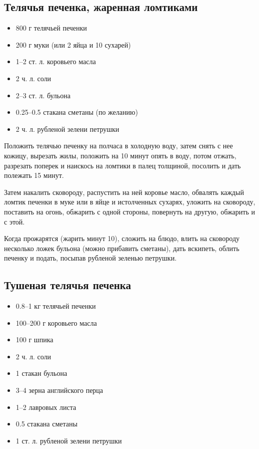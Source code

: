\subsection{Телячья печенка, жаренная ломтиками}

\begin{itemize} 
	\item 800 г телячьей печенки 
    \item 200 г муки (или 2 яйца и 10 сухарей) 
    \item 1–2 ст. л. коровьего масла 
    \item 2 ч. л. соли 
    \item 2–3 ст. л. бульона 
    \item 0.25–0.5 стакана сметаны (по желанию) 
    \item 2 ч. л. рубленой зелени петрушки
\end{itemize}

Положить телячью печенку на полчаса в холодную воду, затем снять с нее кожицу, вырезать жилы, положить на 10 минут опять в воду, потом отжать, разрезать поперек и наискось на ломтики в палец толщиной, посолить и дать полежать 15 минут.

Затем накалить сковороду, распустить на ней коровье масло, обвалять каждый ломтик печенки в муке или в яйце и истолченных сухарях, уложить на сковороду, поставить на огонь, обжарить с одной стороны, повернуть на другую, обжарить и с этой.

Когда прожарятся (жарить минут 10), сложить на блюдо, влить на сковороду несколько ложек бульона (можно прибавить сметаны), дать вскипеть, облить печенку и подать, посыпав рубленой зеленью петрушки.

\subsection{Тушеная телячья печенка}

\begin{itemize}
	\item 0.8–1 кг телячьей печенки 
    \item 100–200 г коровьего масла
    \item 100 г шпика
    \item 2 ч. л. соли
    \item 1 стакан бульона
    \item 3–4 зерна английского перца
    \item 1–2 лавровых листа
    \item 0.5 стакана сметаны 
    \item 1 ст. л. рубленой зелени петрушки
\end{itemize}

